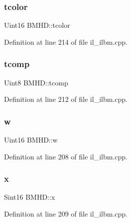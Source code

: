 \mbox{\label{structBMHD_a46baa26ab3a8143f7d5504ca7e7cbc86}} 
\subsubsection{\texorpdfstring{tcolor}{tcolor}}
{\footnotesize\ttfamily Uint16 B\+M\+H\+D\+::tcolor}



Definition at line 214 of file il\+\_\+ilbm.\+cpp.

\mbox{\label{structBMHD_a29674687671d100def378dd377faf52a}} 
\subsubsection{\texorpdfstring{tcomp}{tcomp}}
{\footnotesize\ttfamily Uint8 B\+M\+H\+D\+::tcomp}



Definition at line 212 of file il\+\_\+ilbm.\+cpp.

\mbox{\label{structBMHD_a243b912ed653404a178d6cb9291025b1}} 
\subsubsection{\texorpdfstring{w}{w}}
{\footnotesize\ttfamily Uint16 B\+M\+H\+D\+::w}



Definition at line 208 of file il\+\_\+ilbm.\+cpp.

\mbox{\label{structBMHD_a6ae1ca9a597b76e04f79134c239abd85}} 
\subsubsection{\texorpdfstring{x}{x}}
{\footnotesize\ttfamily Sint16 B\+M\+H\+D\+::x}



Definition at line 209 of file il\+\_\+ilbm.\+cpp.

\mbox{\label{structBMHD_ad1b948c7fdb86dd802cba0a10df66bd1}} 
